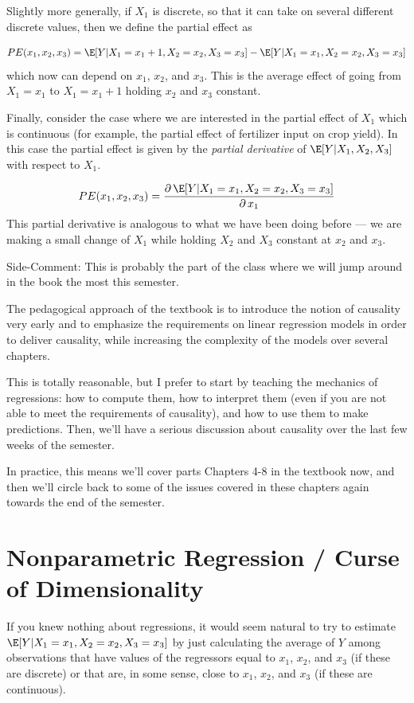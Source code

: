 \documentclass[
  letterpaper,
  DIV=11,
  numbers=noendperiod]{scrreprt}
\begin{document}
Slightly more generally, if \(X_1\) is discrete, so that it can take on
several different discrete values, then we define the partial effect as

\[
  PE(x_1,x_2,x_3) = \E[Y | X_1=x_1+1, X_2=x_2, X_3=x_3] - \E[Y | X_1=x_1,X_2=x_2,X_3=x_3]
\] which now can depend on \(x_1\), \(x_2\), and \(x_3\). This is the
average effect of going from \(X_1=x_1\) to \(X_1=x_1+1\) holding
\(x_2\) and \(x_3\) constant.

Finally, consider the case where we are interested in the partial effect
of \(X_1\) which is continuous (for example, the partial effect of
fertilizer input on crop yield). In this case the partial effect is
given by the \emph{partial derivative} of \(\E[Y|X_1,X_2,X_3]\) with
respect to \(X_1\).

\[
  PE(x_1,x_2,x_3) = \frac{\partial \, \E[Y|X_1=x_1, X_2=x_2, X_3=x_3]}{\partial \, x_1}
\] This partial derivative is analogous to what we have been doing
before --- we are making a small change of \(X_1\) while holding \(X_2\)
and \(X_3\) constant at \(x_2\) and \(x_3\).

{Side-Comment:} This is probably the part of the class where we will
jump around in the book the most this semester.

The pedagogical approach of the textbook is to introduce the notion of
causality very early and to emphasize the requirements on linear
regression models in order to deliver causality, while increasing the
complexity of the models over several chapters.

This is totally reasonable, but I prefer to start by teaching the
mechanics of regressions: how to compute them, how to interpret them
(even if you are not able to meet the requirements of causality), and
how to use them to make predictions. Then, we'll have a serious
discussion about causality over the last few weeks of the semester.

In practice, this means we'll cover parts Chapters 4-8 in the textbook
now, and then we'll circle back to some of the issues covered in these
chapters again towards the end of the semester.

\section{Nonparametric Regression / Curse of
Dimensionality}\label{nonparametric-regression-curse-of-dimensionality}

If you knew nothing about regressions, it would seem natural to try to
estimate \(\E[Y|X_1=x_1,X_2=x_2,X_3=x_3]\) by just calculating the
average of \(Y\) among observations that have values of the regressors
equal to \(x_1\), \(x_2\), and \(x_3\) (if these are discrete) or that
are, in some sense, close to \(x_1\), \(x_2\), and \(x_3\) (if these are
continuous).
\end{document}
